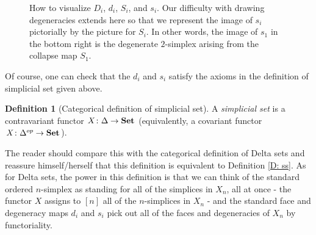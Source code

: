\documentclass[12pt]{article}
\theoremstyle{plain}
\theoremstyle{definition}
\newtheorem{definition}[theorem]{Definition}
\theoremstyle{remark}
\newcommand{\Set}{\text{\textbf{Set}}}
\begin{document}
\begin{figure}[!htp]
\begin{center}
\end{center}
\caption{How to visualize $D_i$, $d_i$, $S_i$, and $s_i$. Our difficulty with drawing degeneracies extends here so that we represent the image of $s_i$ pictorially by the picture for $S_i$. In other words, the image of $s_1$ in the bottom right is the degenerate $2$-simplex arising from  the collapse map $S_1$.}\label{F: fig12}
\end{figure}


Of course, one can check that the $d_i$ and $s_i$ satisfy the axioms in the definition of simplicial set given above.
 


\begin{definition}[Categorical definition of simplicial set]
A \emph{simplicial set} is a contravariant functor $X\colon \Delta\to \Set$ (equivalently, a covariant functor $X\colon  \Delta^{op}\to \Set$). 
\end{definition}


The reader should compare this with the categorical definition of Delta sets and reassure himself/herself that this definition is equivalent to Definition \ref{D: ss}. 
As for Delta sets, the power in this definition is that we can think of the standard ordered $n$-simplex as standing for all of the simplices in $X_n$, all at once - the functor $X$ assigns to $[n]$ all of the $n$-simplices in $X_n$ - and the standard face and degeneracy maps $d_i$ and $s_i$  pick out all of the faces and degeneracies  of $X_n$ by functoriality.
\end{document}
